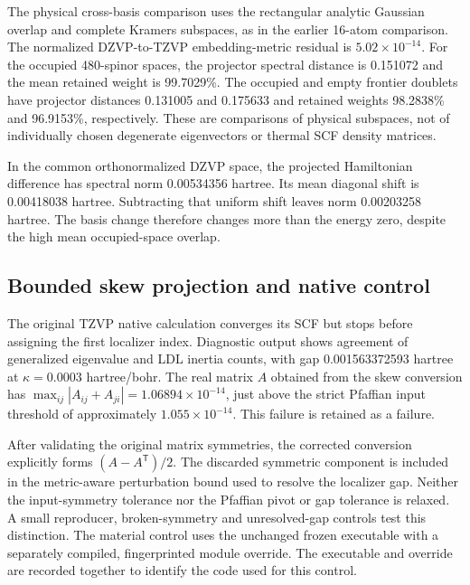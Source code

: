 \documentclass[11pt]{article}
\begin{document}
The physical cross-basis comparison uses the rectangular analytic
Gaussian overlap and complete Kramers subspaces, as in the earlier
16-atom comparison. The normalized DZVP-to-TZVP embedding-metric
residual is $5.02\times10^{-14}$. For the occupied 480-spinor
spaces, the projector spectral distance is 0.151072 and the mean
retained weight is 99.7029\%. The occupied and empty frontier
doublets have projector distances 0.131005 and 0.175633 and
retained weights 98.2838\% and 96.9153\%, respectively.
These are comparisons of physical subspaces, not of individually
chosen degenerate eigenvectors or thermal SCF density matrices.

In the common orthonormalized DZVP space, the projected
Hamiltonian difference has spectral norm 0.00534356 hartree.
Its mean diagonal shift is 0.00418038 hartree. Subtracting that
uniform shift leaves norm 0.00203258 hartree. The basis change
therefore changes more than the energy zero, despite the high
mean occupied-space overlap.

\subsection{Bounded skew projection and native control}
The original TZVP native calculation converges its SCF but stops
before assigning the first localizer index. Diagnostic output
shows agreement of generalized eigenvalue and LDL inertia counts,
with gap 0.001563372593 hartree at
$\kappa=0.0003$ hartree/bohr. The real matrix $A$ obtained from
the skew conversion has
$\max_{ij}|A_{ij}+A_{ji}|=1.06894\times10^{-14}$, just above
the strict Pfaffian input threshold of approximately
$1.055\times10^{-14}$. This failure is retained as a failure.

After validating the original matrix symmetries, the corrected
conversion explicitly forms $(A-A^{\mathsf T})/2$. The discarded
symmetric component is included in the metric-aware perturbation
bound used to resolve the localizer gap. Neither the input-symmetry
tolerance nor the Pfaffian pivot or gap tolerance is relaxed.
A small reproducer, broken-symmetry and unresolved-gap controls
test this distinction. The material control uses the unchanged
frozen executable with a separately compiled, fingerprinted
module override. The executable and override are recorded together
to identify the code used for this control.
\end{document}
